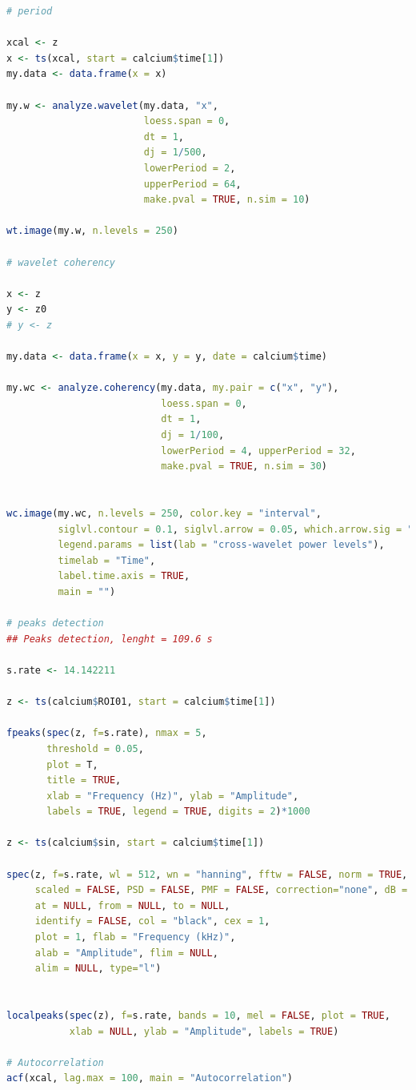 \documentclass{biophys-new}
\begin{document}
\begin{lstlisting}[language=R]
# period

xcal <- z
x <- ts(xcal, start = calcium$time[1])
my.data <- data.frame(x = x)

my.w <- analyze.wavelet(my.data, "x",
                        loess.span = 0,
                        dt = 1,
                        dj = 1/500,
                        lowerPeriod = 2,
                        upperPeriod = 64,
                        make.pval = TRUE, n.sim = 10)

wt.image(my.w, n.levels = 250)

# wavelet coherency

x <- z
y <- z0
# y <- z

my.data <- data.frame(x = x, y = y, date = calcium$time)

my.wc <- analyze.coherency(my.data, my.pair = c("x", "y"),
                           loess.span = 0,
                           dt = 1,
                           dj = 1/100,
                           lowerPeriod = 4, upperPeriod = 32,
                           make.pval = TRUE, n.sim = 30)


wc.image(my.wc, n.levels = 250, color.key = "interval",
         siglvl.contour = 0.1, siglvl.arrow = 0.05, which.arrow.sig = "wt",
         legend.params = list(lab = "cross-wavelet power levels"),
         timelab = "Time",
         label.time.axis = TRUE,
         main = "")

# peaks detection
## Peaks detection, lenght = 109.6 s

s.rate <- 14.142211

z <- ts(calcium$ROI01, start = calcium$time[1])

fpeaks(spec(z, f=s.rate), nmax = 5,
       threshold = 0.05,
       plot = T,
       title = TRUE,
       xlab = "Frequency (Hz)", ylab = "Amplitude",
       labels = TRUE, legend = TRUE, digits = 2)*1000

z <- ts(calcium$sin, start = calcium$time[1])

spec(z, f=s.rate, wl = 512, wn = "hanning", fftw = FALSE, norm = TRUE,
     scaled = FALSE, PSD = FALSE, PMF = FALSE, correction="none", dB = NULL, dBref = NULL,
     at = NULL, from = NULL, to = NULL,
     identify = FALSE, col = "black", cex = 1,
     plot = 1, flab = "Frequency (kHz)",
     alab = "Amplitude", flim = NULL,
     alim = NULL, type="l")


localpeaks(spec(z), f=s.rate, bands = 10, mel = FALSE, plot = TRUE,
           xlab = NULL, ylab = "Amplitude", labels = TRUE)

# Autocorrelation
acf(xcal, lag.max = 100, main = "Autocorrelation")


\end{lstlisting}
\end{document}
